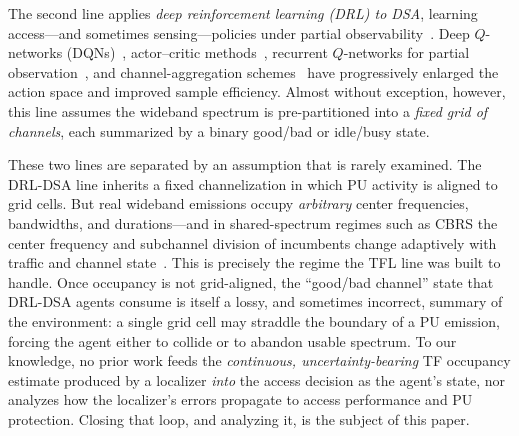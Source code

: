 \documentclass[journal]{IEEEtran}
\begin{document}
The second line applies \emph{deep reinforcement learning (DRL) to DSA},
learning access---and sometimes sensing---policies under partial
observability~\cite{wang2018,zhong2019,xu2020partial,li2020aggregation,
li2024hmadrl,bokobza2023ddqsa}. Deep $Q$-networks (DQNs)~\cite{wang2018},
actor--critic methods~\cite{zhong2019}, recurrent $Q$-networks for partial
observation~\cite{xu2020partial,hausknecht2015drqn}, and channel-aggregation
schemes~\cite{li2020aggregation} have progressively enlarged the action space
and improved sample efficiency. Almost without exception, however, this line
assumes the wideband spectrum is pre-partitioned into a \emph{fixed grid of
channels}, each summarized by a binary good/bad or idle/busy state.

These two lines are separated by an assumption that is rarely examined. The
DRL-DSA line inherits a fixed channelization in which PU activity is aligned
to grid cells. But real wideband emissions occupy \emph{arbitrary} center
frequencies, bandwidths, and durations---and in shared-spectrum regimes such
as CBRS the center frequency and subchannel division of incumbents change
adaptively with traffic and channel state~\cite{sohul2015cbrs,zhao2025trtfl_ssl}.
This is precisely the regime the TFL line was built to handle. Once occupancy
is not grid-aligned, the ``good/bad channel'' state that DRL-DSA agents
consume is itself a lossy, and sometimes incorrect, summary of the
environment: a single grid cell may straddle the boundary of a PU emission,
forcing the agent either to collide or to abandon usable spectrum. To our
knowledge, no prior work feeds the \emph{continuous, uncertainty-bearing} TF
occupancy estimate produced by a localizer \emph{into} the access decision as
the agent's state, nor analyzes how the localizer's errors propagate to access
performance and PU protection. Closing that loop, and analyzing it, is the
subject of this paper.
\end{document}
